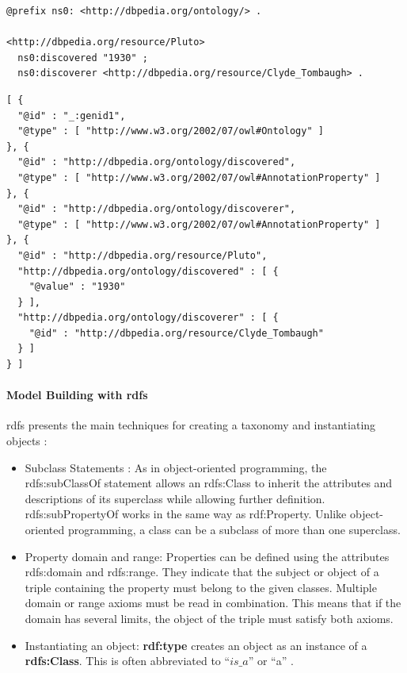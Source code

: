                 \begin{lstlisting}[caption=Example of RDF Serialization in Turtle, label={lst:rdf-turtle}]
@prefix ns0: <http://dbpedia.org/ontology/> .

<http://dbpedia.org/resource/Pluto>
  ns0:discovered "1930" ;
  ns0:discoverer <http://dbpedia.org/resource/Clyde_Tombaugh> .
                \end{lstlisting}

                \begin{lstlisting}[caption=Example of RDF Serialization in JSON-LD, label={lst:rdf-json-ld}]
[ {
  "@id" : "_:genid1",
  "@type" : [ "http://www.w3.org/2002/07/owl#Ontology" ]
}, {
  "@id" : "http://dbpedia.org/ontology/discovered",
  "@type" : [ "http://www.w3.org/2002/07/owl#AnnotationProperty" ]
}, {
  "@id" : "http://dbpedia.org/ontology/discoverer",
  "@type" : [ "http://www.w3.org/2002/07/owl#AnnotationProperty" ]
}, {
  "@id" : "http://dbpedia.org/resource/Pluto",
  "http://dbpedia.org/ontology/discovered" : [ {
    "@value" : "1930"
  } ],
  "http://dbpedia.org/ontology/discoverer" : [ {
    "@id" : "http://dbpedia.org/resource/Clyde_Tombaugh"
  } ]
} ]
                \end{lstlisting}

                
        
        
            \paragraph{Model Building with \acrshort{rdfs}}
            \acrfull{rdfs} presents the main techniques for creating a taxonomy and instantiating objects \cite{spelten2023simulation} : 

            \begin{itemize}
                \item Subclass Statements : As in object-oriented programming, the rdfs:subClassOf statement allows an rdfs:Class to inherit the attributes and descriptions of its superclass while allowing further definition. rdfs:subPropertyOf works in the same way as rdf:Property. Unlike object-oriented programming, a class can be a subclass of more than one superclass. 
                \item Property domain and range: Properties can be defined using the attributes rdfs:domain and rdfs:range. They indicate that the subject or object of a triple containing the property must belong to the given classes. Multiple domain or range axioms must be read in combination. This means that if the domain has several limits, the object of the triple must satisfy both axioms. 
                \item Instantiating an object: \textbf{rdf:type} creates an object as an instance of a \textbf{rdfs:Class}. This is often abbreviated to “$is\_a$” or “a” \cite{li2005ontology}.
            \end{itemize}
    
